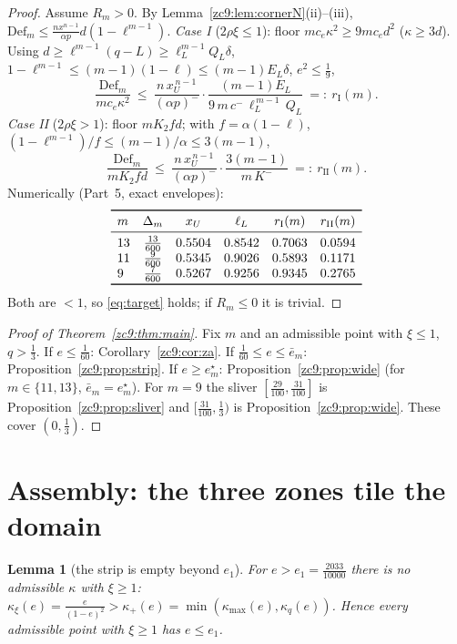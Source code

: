 \documentclass[11pt]{amsart}
\newtheorem{lemma}[theorem]{Lemma}
\newcommand{\Def}{\mathrm{Def}}
\newcommand{\kxi}{\kappa_\xi}
\newcommand{\kq}{\kappa_q}
\newcommand{\kmx}{\kappa_{\max}}
\newcommand{\khi}{\kappa_{+}}
\begin{document}
\begin{proof}
Assume $R_m>0$.  By Lemma~\ref{zc9:lem:cornerN}(ii)--(iii),
$\Def_m\le\tfrac{n x^{n-1}}{\alpha p}d(1-\ell^{m-1})$.
\emph{Case I} ($2\rho\xi\le1$): floor $mc_e\kappa^2\ge9mc_e d^2$
($\kappa\ge3d$).  Using $d\ge\ell^{m-1}(q-L)\ge\ell_L^{m-1}Q_L\delta$,
$1-\ell^{m-1}\le(m-1)(1-\ell)\le(m-1)E_L\delta$, $e^2\le\tfrac19$,
\[
 \frac{\Def_m}{mc_e\kappa^2}\ \le\
 \frac{n\,x_U^{\,n-1}}{(\alpha p)^-}\cdot\frac{(m-1)E_L}
 {9\,m\,c^-\,\ell_L^{\,m-1}\,Q_L}\ =:\ r_{\mathrm I}(m).
\]
\emph{Case II} ($2\rho\xi>1$): floor $mK_2fd$; with $f=\alpha(1-\ell)$,
$(1-\ell^{m-1})/f\le(m-1)/\alpha\le3(m-1)$,
\[
 \frac{\Def_m}{mK_2fd}\ \le\
 \frac{n\,x_U^{\,n-1}}{(\alpha p)^-}\cdot\frac{3(m-1)}{m\,K^-}\ =:\
 r_{\mathrm{II}}(m).
\]
Numerically (Part~5, exact envelopes):
\[
\begin{array}{lccccc}
\toprule
m & \Delta_m & x_U & \ell_L & r_{\mathrm I}(m) & r_{\mathrm{II}}(m)\\
\midrule
13 & \tfrac{13}{600} & 0.5504 & 0.8542 & 0.7063 & 0.0594\\
11 & \tfrac{9}{600}  & 0.5345 & 0.9026 & 0.5893 & 0.1171\\
 9 & \tfrac{7}{600}  & 0.5267 & 0.9256 & 0.9345 & 0.2765\\
\bottomrule
\end{array}
\]
Both are $<1$, so \eqref{eq:target} holds; if $R_m\le0$ it is trivial.
\end{proof}

\begin{proof}[Proof of Theorem~\ref{zc9:thm:main}]
Fix $m$ and an admissible point with $\xi\le1$, $q>\tfrac13$.  If
$e\le\tfrac1{60}$: Corollary~\ref{zc9:cor:za}.  If
$\tfrac1{60}\le e\le\bar e_m$: Proposition~\ref{zc9:prop:strip}.  If
$e\ge e^\star_m$: Proposition~\ref{zc9:prop:wide} (for $m\in\{11,13\}$,
$\bar e_m=e^\star_m$).  For $m=9$ the sliver
$[\tfrac{29}{100},\tfrac{31}{100}]$ is Proposition~\ref{zc9:prop:sliver} and
$[\tfrac{31}{100},\tfrac13)$ is Proposition~\ref{zc9:prop:wide}.  These cover
$(0,\tfrac13)$.
\end{proof}

\section{Assembly: the three zones tile the domain}\label{sec:assembly}

\begin{lemma}[the strip is empty beyond $e_1$]\label{lem:e1}
For $e>e_1=\tfrac{2033}{10000}$ there is no admissible $\kappa$ with $\xi\ge1$:
$\kxi(e)=\tfrac{e}{(1-e)^2}>\khi(e)=\min(\kmx(e),\kq(e))$.  Hence every admissible
point with $\xi\ge1$ has $e\le e_1$.
\end{lemma}
\end{document}
